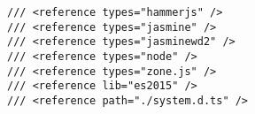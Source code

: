 \begin{verbatim}
/// <reference types="hammerjs" />
/// <reference types="jasmine" />
/// <reference types="jasminewd2" />
/// <reference types="node" />
/// <reference types="zone.js" />
/// <reference lib="es2015" />
/// <reference path="./system.d.ts" />
\end{verbatim}
